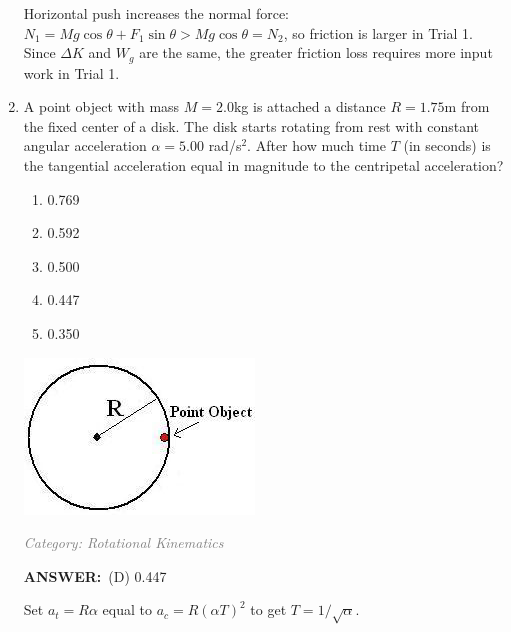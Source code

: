 \documentclass[12pt, a4paper]{article}
\makeatletter
\newcommand{\finalanswer}[1]{\textbf{ANSWER:}~#1}
\newif\if@categoryprinted
\newcommand{\category}[1]{\if@categoryprinted\relax\else\textit{\textcolor{gray}{Category: #1}}\global\@categoryprintedtrue\fi}
\newcommand{\tags}[1]{}
\makeatother
\begin{document}
\begin{CJK*}{UTF8}{gbsn}
\begin{enumerate}[itemsep=1.0em, topsep=0.6em]
\begin{solutionbox}
Horizontal push increases the normal force: $N_1=Mg\cos\theta+F_1\sin\theta>Mg\cos\theta=N_2$, so friction is larger in Trial 1. Since $\Delta K$ and $W_g$ are the same, the greater friction loss requires more input work in Trial 1.
\end{solutionbox}

\newpage

\item \label{prob:15}
\noindent\begin{minipage}[t]{0.6\linewidth}
\vspace{0pt}
A point object with mass $M=2.0$kg is attached a distance $R=1.75$m from the fixed center of a disk. The disk starts rotating from rest with constant angular acceleration $\alpha = 5.00$ rad/s$^2$. After how much time $T$ (in seconds) is the tangential acceleration equal in magnitude to the centripetal acceleration?
\begin{enumerate}[label=(\Alph*)]
    \item 0.769
    \item 0.592
    \item 0.500
    \item 0.447
    \item 0.350
\end{enumerate}
\end{minipage}%
\hfill
\begin{minipage}[t]{0.35\linewidth}
\vspace{0pt}
\centering
\includegraphics[width=\linewidth]{Problem_15_Figure.png}
\end{minipage}

\category{Rotational Kinematics} \tags{}
\begin{answerbox}
\finalanswer{(D) 0.447}
\end{answerbox}
\begin{insightbox}
Set $a_t=R\alpha$ equal to $a_c=R(\alpha T)^2$ to get $T=1/\sqrt{\alpha}$.
\end{insightbox}
\begin{solutionbox}


\end{solutionbox}
\end{enumerate}
\end{CJK*}
\end{document}
